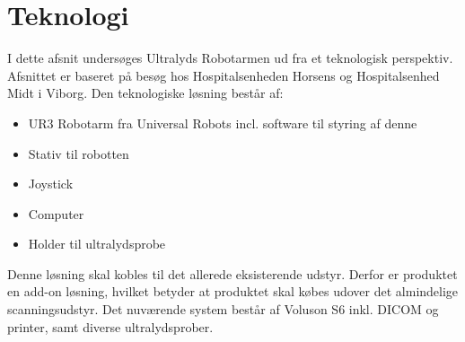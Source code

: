 \chapter{Teknologi}
I dette afsnit undersøges Ultralyds Robotarmen ud fra et teknologisk perspektiv. Afsnittet er baseret på besøg hos Hospitalsenheden Horsens og Hospitalsenhed Midt i Viborg. Den teknologiske løsning består af:
\begin{itemize}
\item UR3 Robotarm fra Universal Robots incl. software til styring af denne
\item Stativ til robotten
\item Joystick
\item Computer
\item Holder til ultralydsprobe
\end{itemize}
Denne løsning skal kobles til det allerede eksisterende udstyr. Derfor er produktet en add-on løsning, hvilket betyder at produktet skal købes udover det almindelige scanningsudstyr. Det nuværende system består af Voluson S6 inkl. DICOM og printer, samt diverse ultralydsprober.  

